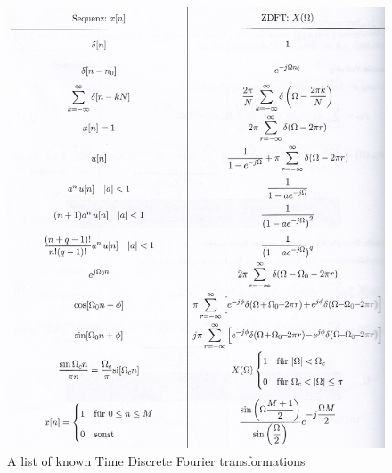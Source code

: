 \documentclass[10pt,a4paper]{article}
\begin{document}
\begin{figure}[H]
\centering
\includegraphics[scale=0.9]{2FourierDiscreteIdentities.PNG}
\caption{A list of known Time Discrete Fourier transformations}
\end{figure}

\newpage
\end{document}
